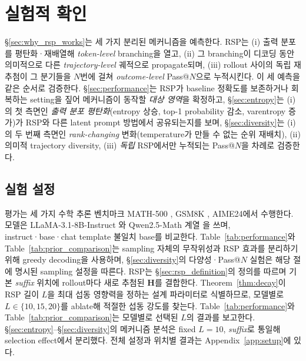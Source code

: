 
\section{실험적 확인}\label{sec:experimental_analysis}

\S\ref{sec:why_rsp_works}는 세 가지 분리된 메커니즘을 예측한다. RSP는 (i) 출력 분포를 평탄화·재배열해 \emph{token-level} branching을 열고, (ii) 그 branching이 디코딩 동안 의미적으로 다른 \emph{trajectory-level} 궤적으로 propagate되며, (iii) rollout 사이의 독립 재추첨이 그 분기들을 $N$번에 걸쳐 \emph{outcome-level} Pass@$N$으로 누적시킨다. 이 세 예측을 같은 순서로 검증한다. \S\ref{sec:performance}는 RSP가 baseline 정확도를 보존하거나 회복하는 setting을 짚어 메커니즘이 동작할 \emph{대상 영역}을 확정하고, \S\ref{sec:entropy}는 (i)의 첫 측면인 \emph{출력 분포 평탄화}(entropy 상승, top-1 probability 감소, varentropy 증가)가 RSP와 다른 latent prompt 방법에서 공유되는지를 보며, \S\ref{sec:diversity}는 (i)의 두 번째 측면인 \emph{rank-changing} 변화(temperature가 만들 수 없는 순위 재배치), (ii) 의미적 trajectory diversity, (iii) \emph{독립} RSP에서만 누적되는 Pass@$N$을 차례로 검증한다.

\subsection{실험 설정}\label{sec:setup}

평가는 세 가지 수학 추론 벤치마크 MATH-500 \citep{lightman2024lets}, GSM8K \citep{cobbe2021training}, AIME24에서 수행한다. 모델은 LLaMA-3.1-8B-Instruct \citep{grattafiori2024llama}와 Qwen2.5-Math 계열 \citep{yang2024qwen25math}을 쓰며, instruct·base·chat template 불일치 base를 비교한다. Table~\ref{tab:performance}와 Table~\ref{tab:prior_comparison}는 sampling 자체의 무작위성과 RSP 효과를 분리하기 위해 greedy decoding을 사용하며, \S\ref{sec:diversity}의 다양성·Pass@$N$ 실험은 해당 절에 명시된 sampling 설정을 따른다. RSP는 \S\ref{sec:rsp_definition}의 정의를 따르며 기본 \emph{suffix} 위치에 rollout마다 새로 추첨된 $\mathbf{H}$를 결합한다. Theorem~\ref{thm:decay}이 RSP 길이 $L$을 최대 섭동 영향력을 정하는 설계 파라미터로 식별하므로, 모델별로 $L \in \{10,15,20\}$를 ablate해 적절한 섭동 강도를 찾는다. Table~\ref{tab:performance}와 Table~\ref{tab:prior_comparison}는 모델별로 선택된 $L$의 결과를 보고한다. \S\ref{sec:entropy}–\S\ref{sec:diversity}의 메커니즘 분석은 fixed $L=10$, \emph{suffix}로 통일해 selection effect에서 분리했다. 전체 설정과 위치별 결과는 Appendix~\ref{app:setup}에 있다.

